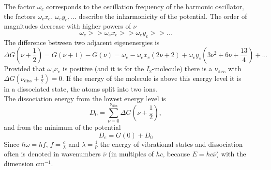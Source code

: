 The factor $\omega_e$ corresponds to the oscillation frequency of the harmonic oscillator, the factors $\omega_e x_e$, $\omega_e y_e, \ldots$ 
describe the inharmonicity of the potential. The order of magnitudes decrease with higher powers of $\nu$
\begin{equation}
  \omega_e >> \omega_e x_e >> \omega_e y_e >> \ldots
\end{equation}
The difference between two adjacent eigenenergies is
\begin{equation}
\label{eq:iho:energydiff}
  \Delta G \left( \nu + \frac{1}{2} \right) = G(\nu + 1) - G(\nu) = \omega_e - \omega_e x_e (2\nu + 2) + \omega_e y_e \left( 3\nu^2 + 6 \nu + \frac{13}{4} \right) + \ldots 
\end{equation}
Provided that $\omega_e x_e$ is positive (and it is for the $I_2$-molecule) there is a 
$\nu_{\text{diss}}$ with ${\Delta G (\nu_{\text{diss}} + \frac{1}{2}) = 0}$. If the energy of the molecule is above this energy level it 
is in a dissociated state, the atoms split into two ions. \\
The dissociation energy from the lowest energy level is
\begin{equation}
\label{eq:dissenergy}
  D_0 = \sum_{\nu=0}^{\nu_{\text{diss}}} \Delta G \left( \nu + \frac{1}{2} \right),
\end{equation}
and from the minimum of the potential
\begin{equation}
  \label{eq:dissenergy2}
  D_e = G(0) + D_0
\end{equation} 
Since $\hbar \omega = h f$, $f = \frac{c}{\lambda}$ and $\lambda = \frac{1}{\bar{\nu}}$ the energy of vibrational states and dissociation often 
is denoted in wavenumbers $\bar{\nu}$ 
(in multiples of $h c$, because $E = hc\bar{\nu}$) with the dimension $\text{cm}^{-1}$.

